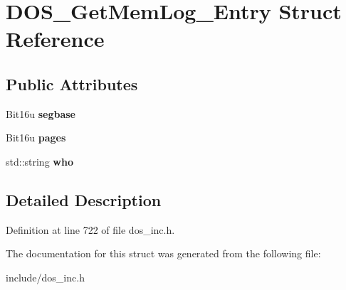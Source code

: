 \hypertarget{structDOS__GetMemLog__Entry}{\section{D\-O\-S\-\_\-\-Get\-Mem\-Log\-\_\-\-Entry Struct Reference}
\label{structDOS__GetMemLog__Entry}
}
\subsection*{Public Attributes}
\begin{DoxyCompactItemize}
\item 
\hypertarget{structDOS__GetMemLog__Entry_ae0b40132debcc642571b174128f14a0c}{Bit16u {\bfseries segbase}}\label{structDOS__GetMemLog__Entry_ae0b40132debcc642571b174128f14a0c}

\item 
\hypertarget{structDOS__GetMemLog__Entry_a1687425bea21c2dba1d7dcf5137ac5e3}{Bit16u {\bfseries pages}}\label{structDOS__GetMemLog__Entry_a1687425bea21c2dba1d7dcf5137ac5e3}

\item 
\hypertarget{structDOS__GetMemLog__Entry_ad8a1936e9a6a49aa924a0fc9e585d18f}{std\-::string {\bfseries who}}\label{structDOS__GetMemLog__Entry_ad8a1936e9a6a49aa924a0fc9e585d18f}

\end{DoxyCompactItemize}


\subsection{Detailed Description}


Definition at line 722 of file dos\-\_\-inc.\-h.



The documentation for this struct was generated from the following file\-:\begin{DoxyCompactItemize}
\item 
include/dos\-\_\-inc.\-h\end{DoxyCompactItemize}
